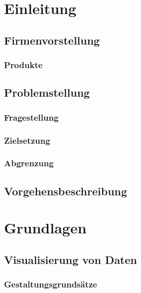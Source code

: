 \documentclass[11pt]{article}
\begin{document}
\maketitle \clearpage

\tableofcontents \clearpage


\section{Einleitung}\label{intro}
\lipsum[1-14]
\subsection{Firmenvorstellung}
\subsubsection{Produkte}
\subsection{Problemstellung}
\subsubsection{Fragestellung}
\subsubsection{Zielsetzung}
\subsubsection{Abgrenzung}
\subsection{Vorgehensbeschreibung}


\section{Grundlagen}
\lipsum[1-21]
\subsection{Visualisierung von Daten}
\subsubsection{Gestaltungsgrundsätze}
\end{document}
